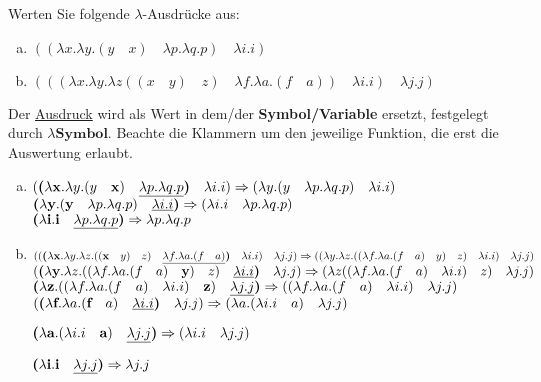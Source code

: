\begin{card}
  Werten Sie folgende $\lambda$-Ausdrücke aus:
  \begin{enumerate}[a)]
    \item $((\lambda x.\lambda y.(y \quad x) \quad \lambda p.\lambda q.p) \quad \lambda i.i)$
    \item $(((\lambda x.\lambda y.\lambda z((x \quad y) \quad z) \quad \lambda f.\lambda a.(f \quad a)) \quad \lambda i.i) \quad\lambda j.j)$
  \end{enumerate}
  \hr
  Der \underline{Ausdruck} wird als Wert in dem/der \textbf{Symbol/Variable} ersetzt, festgelegt durch $\lambda\mathbf{Symbol}$. Beachte die Klammern um den jeweilige Funktion, die erst die Auswertung erlaubt.
  \begin{enumerate}[a)]
    \item
      $(\textbf{(}\lambda \mathbf{x}.\lambda y.(y \quad \mathbf{x}) \quad \uline{\lambda p.\lambda q.p}\textbf{)} \quad \lambda i.i)
      \Rightarrow
      (\lambda y.(y \quad \lambda p.\lambda q.p) \quad \lambda i.i)$\\

      $\textbf{(}\lambda \mathbf{y}.(\mathbf{y} \quad \lambda p.\lambda q.p) \quad \uline{\lambda i.i}\textbf{)}
      \Rightarrow
      (\lambda i.i \quad \lambda p.\lambda q.p)$\\

      $\textbf{(}\lambda \mathbf{i}.\mathbf{i} \quad \uline{\lambda p.\lambda q.p}\textbf{)}
      \Rightarrow
      \lambda p.\lambda q.p$
    \item
      $((\textbf{(}\lambda \mathbf{x}.\lambda y.\lambda z.((\mathbf{x} \quad y) \quad z) \quad \uline{\lambda f.\lambda a.(f \quad a)}\textbf{)} \quad \lambda i.i) \quad \lambda j.j) \Rightarrow
      ((\lambda y.\lambda z.((\lambda f.\lambda a.(f \quad a) \quad y) \quad z) \quad \lambda i.i) \quad \lambda j.j)$
      \vfill
      $(\textbf{(}\lambda \textbf{y}.\lambda z.((\lambda f.\lambda a.(f \quad a) \quad \textbf{y}) \quad z) \quad \uline{\lambda i.i} \textbf{)} \quad \lambda j.j) \Rightarrow
      (\lambda z((\lambda f.\lambda a.(f \quad a) \quad \lambda i.i) \quad z) \quad \lambda j.j)$
      \vfill
      $\textbf{(}\lambda \textbf{z}.((\lambda f.\lambda a.(f \quad a) \quad \lambda i.i) \quad \textbf{z}) \quad \uline{\lambda j.j} \textbf{)} \Rightarrow
      ((\lambda f.\lambda a.(f \quad a) \quad \lambda i.i) \quad \lambda j.j)$
      \vfill
      $(\textbf{(}\lambda \textbf{f}.\lambda a.(\textbf{f} \quad a) \quad \uline{\lambda i.i}\textbf{)} \quad \lambda j.j) \Rightarrow
      (\lambda a.(\lambda i.i \quad a) \quad \lambda j.j)$

      $\textbf{(}\lambda \textbf{a}.(\lambda i.i \quad \textbf{a}) \quad \uline{\lambda j.j}\textbf{)} \Rightarrow
      (\lambda i.i \quad \lambda j.j)$

      $\textbf{(}\lambda \textbf{i}.\textbf{i} \quad \uline{\lambda j.j}\textbf{)} \Rightarrow
      \lambda j.j$
  \end{enumerate}
\end{card}

